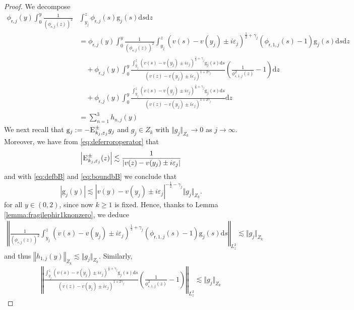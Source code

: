 \documentclass[11pt,reqno]{amsproc}
\theoremstyle{definition}
\numberwithin{equation}{section}
\newcommand{\sr}{{\mathsf{r}}}
\renewcommand{\d}{\mathrm{d}}
\newcommand{\ep}{\varepsilon}
\begin{document}
\begin{proof}
We decompose
\begin{align*}
\phi_{\sr,j}(y)\int_0^y \frac{1}{(\phi_{\sr,j}(z))^2} &\int_{y_j}^z \phi_{\sr,j}(s) \mathrm{g}_j(s) \d s \d z \\
&= \phi_{\sr,j}(y)\int_0^y \frac{1}{(\phi_{\sr,j}(z))^2}\int_{y_j}^z (v(s) - v(y_j) \pm i\ep_j)^{\frac12+\gamma_j}\left( \phi_{\sr,1,j}(s) -1 \right)  \mathrm{g}_j(s) \d s \d z \\
&\quad + \phi_{\sr,j}(y)\int_0^y \frac{\int_{y_j}^z (v(s) - v(y_j) \pm i\ep_j)^{\frac12+\gamma_j} \mathrm{g}_j(s) \d s }{(v(z) - v(y_j)\pm i\ep_j)^{1+2\gamma_j} } \left( \frac{1}{\phi_{\sr,1,j}^2(z)} - 1 \right) \d z \\
&\quad + \phi_{\sr,j}(y)\int_0^y \frac{\int_{y_j}^z (v(s) - v(y_j) \pm i\ep_j)^{\frac12+\gamma_j} \mathrm{g}_j(s) \d s }{(v(z) - v(y_j)\pm i\ep_j)^{1+2\gamma_j} }  \d z \\
&= \sum_{n=1}^3h_{n,j}(y) 
\end{align*}
We next recall that $\mathrm{g}_j:=-\textsc{E}_{k_j,\ep_j}^\pm g_j$ and $g_j\in Z_k$ with $\Vert g_j \Vert_{Z_k}\rightarrow 0$ as $j\rightarrow \infty$. Moreover, we have from \eqref{eq:deferroroperator} that
\begin{align*}
\left| \textsc{E}_{k_j,\ep_j}^\pm(z) \right| \lesssim \frac{1}{|v(z) -v(y_j) \pm i\ep_j|}
\end{align*}
and with \eqref{eq:defbB} and  \eqref{eq:boundbB} we conclude that
\begin{equation}\label{eq:rmrjbound}
\left| \mathrm{g}_j(y) \right| \lesssim  |v(y)-v(y_j)\pm i\ep_{j}|^{-\frac12-\gamma_j} \Vert g_j \Vert_{Z_k}.
\end{equation}
for all $y\in (0,2)$, since now $k\geq 1$ is fixed. Hence, thanks to Lemma \ref{lemma:fragilephir1knonzero}, we deduce
\begin{align*}
\left \Vert \frac{1}{(\phi_{\sr,j}(z))^2}\int_{y_j}^z (v(s) - v(y_j) \pm i\ep_j)^{\frac12+\gamma_j}\left( \phi_{\sr,1,j}(s) -1 \right)  \mathrm{g}_j(s) \d s \right \Vert_{L^2_z} \lesssim \Vert g_j \Vert_{Z_k}
\end{align*}
and thus $ \left \Vert h_{1,j}(y)  \right \Vert_{Z_k} \lesssim \Vert g_j \Vert_{Z_k}$. Similarly, 
\begin{align*}
\left \Vert \frac{\int_{y_j}^z (v(s) - v(y_j) \pm i\ep_j)^{\frac12+\gamma_j} \mathrm{g}_j(s) \d s }{(v(z) - v(y_j)\pm i\ep_j)^{1+2\gamma_j} } \left( \frac{1}{\phi_{\sr,1,j}^2(z)} - 1 \right) \right \Vert_{L^2_z} \lesssim \Vert g_j \Vert_{Z_k}
\end{align*}

\end{proof}
\end{document}
